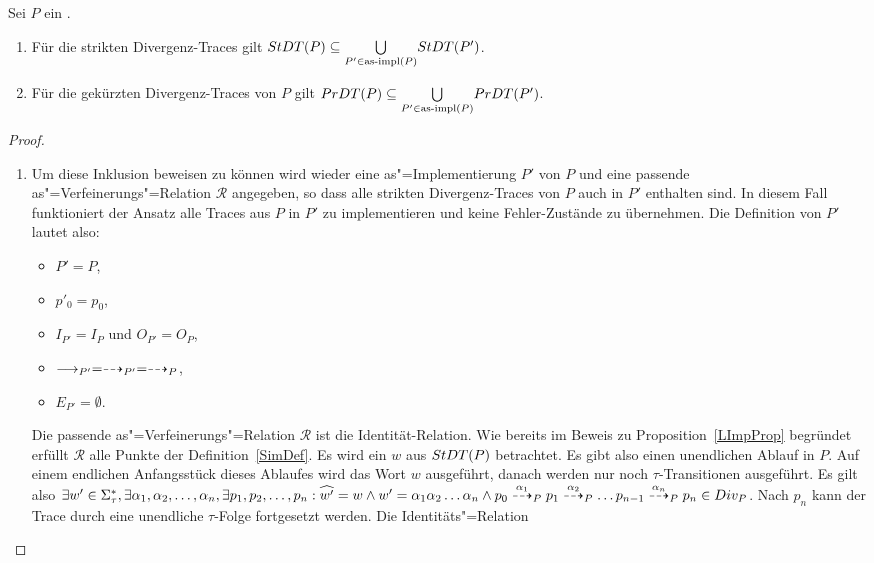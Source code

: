 \begin{Prop}
  \label{DivTraceProp}
  Sei $P$ ein \MEIO{}.
  \begin{enumerate}
    \item Für die strikten Divergenz-Traces gilt $StDT (P) \subseteq
      \underset{P'\in\mathrm{as}\text{-}\mathrm{impl} (P)}{\bigcup} StDT (P')$.
    \item Für die gekürzten Divergenz-Traces von $P$ gilt $PrDT (P) \subseteq
      \underset{P'\in\mathrm{as}\text{-}\mathrm{impl} (P)}{\bigcup} PrDT (P')$.
  \end{enumerate}
\end{Prop}
\begin{proof}\mbox{}
  \begin{enumerate}
    \item Um diese Inklusion beweisen zu können wird wieder eine
      as"=Implementierung $P'$ von $P$ und eine passende
      as"=Verfeinerungs"=Relation $\mathcal{R}$ angegeben, so dass alle
      strikten Divergenz-Traces von $P$ auch in $P'$ enthalten sind. In diesem
      Fall funktioniert der Ansatz alle Traces aus $P$ in $P'$ zu
      implementieren und keine Fehler-Zustände zu übernehmen. Die Definition
      von $P'$ lautet also:
      \begin{itemize}
        \item $P'=P$,
        \item $p'_0=p_0$,
        \item $I_{P'}=I_P$ und $O_{P'}=O_P$,
        \item $\must _{P'} =\may _{P'} = \may _P$,
        \item $E_{P'}=\emptyset$.
      \end{itemize}
      Die passende as"=Verfeinerungs"=Relation $\mathcal{R}$ ist die
      Identität-Relation. Wie bereits im Beweis zu Proposition~\ref{LImpProp}
      begründet erfüllt $\mathcal{R}$ alle Punkte der Definition~\ref{SimDef}.
      Es wird ein $w$ aus $StDT (P)$ betrachtet. Es gibt also einen
      unendlichen Ablauf in $P$. Auf einem endlichen Anfangsstück dieses
      Ablaufes wird das Wort $w$ ausgeführt, danach werden nur noch
      $\tau$-Transitionen ausgeführt. Es gilt also $\exists w' \in \Sigma
      _{\tau}^*, \exists \alpha _1, \alpha _2, \dots , \alpha _n, \exists p_1,
      p_2, \dots , p_n: \widehat{w'} = w \land w' = \alpha _1\alpha _2\dots
      \alpha _n \land p_0 \may[\alpha _1]_P p_1 \may[\alpha _2]_P \dots p_{n-1}
      \may[\alpha _n]_P p_n \in Div _P$. Nach $p_n$ kann der Trace durch eine
      unendliche $\tau$-Folge fortgesetzt werden. Die Identitäts"=Relation

\end{enumerate}
\end{proof}
